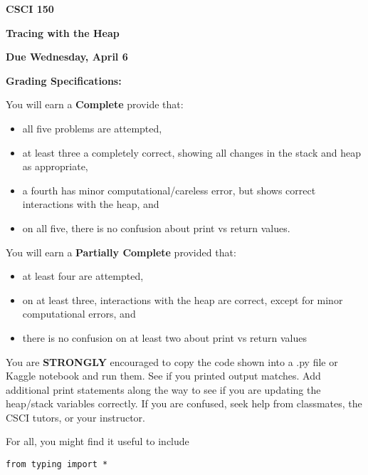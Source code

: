 \documentclass{article}
\begin{document}
\textbf{CSCI 150 }

\vspace{0.1in}

\begin{center}
  \textbf{Tracing with the Heap}
\end{center}

\vspace{0.2in}
\textbf{Due Wednesday, April 6}

\vspace{0.2in}

\textbf{Grading Specifications:}

You will earn a \textbf{Complete} provide that:
\begin{itemize}
  \item all five problems are attempted,
  \item at least three a completely correct, showing all changes in the stack and heap as appropriate,
  \item a fourth has minor computational/careless error, but shows correct interactions with the heap, and
  \item on all five, there is no confusion about print vs return values.
\end{itemize}

You will earn a \textbf{Partially Complete} provided that:
\begin{itemize}
  \item  at least four are attempted,
  \item  on at least three, interactions with the heap are correct, except for minor computational errors, and
  \item  there is no confusion on at least two about print vs return values
\end{itemize}

You are \textbf{STRONGLY} encouraged to copy the code shown into a .py file or Kaggle notebook and run them. See if you printed output matches. Add additional print statements along the way to see if you are updating the heap/stack variables correctly. If you are confused, seek help from classmates, the CSCI tutors, or your instructor.

\vspace{0.2in}
For all, you might find it useful to include
\vspace{0.1in}

\verb|from typing import *|

\vspace{0.1in}
\end{document}
